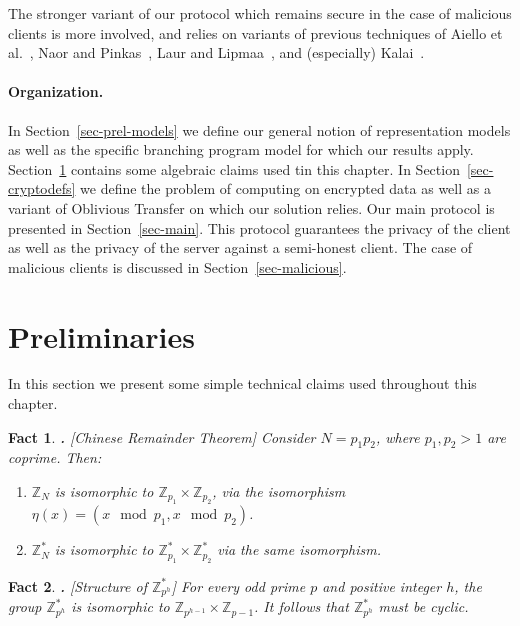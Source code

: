 \documentclass{article}
\newcommand{\Z}{{\mathbb{Z}}}
\newtheorem{FACT}{Fact}[section]
\newenvironment{fact}{\begin{FACT} \hspace{-.85em} {\bf .} \rm}%
	{\end{FACT}}
\newcommand{\U}[1]{\mathbb{Z}_{#1}^*}
\begin{document}
The stronger variant of our protocol which remains secure in the
case of malicious clients is more involved, and relies on variants
of previous techniques of Aiello et al.~\cite{AIR01}, Naor and
Pinkas~\cite{NP01}, Laur and Lipmaa~\cite{L05}, and (especially)
Kalai~\cite{T05}.


\paragraph{Organization.} In Section~\ref{sec-prel-models} we define our
general notion of representation models as well as the specific
branching program model for which our results apply. Section~\ref{sec-bp-prelims} contains
some algebraic claims used tin this chapter.
In Section~\ref{sec-cryptodefs} we define the problem of computing on
encrypted data as well as a variant of Oblivious Transfer on which
our solution relies. Our main protocol is presented in
Section~\ref{sec-main}. This protocol guarantees the privacy of the
client as well as the privacy of the server against a semi-honest
client. The case of malicious clients is discussed in
Section~\ref{sec-malicious}.

\section{Preliminaries}\label{sec-bp-prelims}
In this section we present some simple technical claims used throughout this chapter.

\begin{fact}[Chinese Remainder Theorem]
  \label{fact-crt} Consider $N=p_1p_2$, where $p_1,p_2>1$ are
  coprime. Then:
  \begin{enumerate}
    \item $\Z_N$ is isomorphic to $\Z_{p_1}\times\Z_{p_2}$,
    via the isomorphism $\eta(x)=(x\mod p_1,x\mod p_2)$.
    \item $\U{N}$ is isomorphic to $\U{p_1}\times\U{p_2}$ via the same
    isomorphism.
  \end{enumerate}
\end{fact}

\begin{fact}[Structure of $\U{p^h}$]
  \label{fact-zp-cyc} For every odd prime $p$ and positive integer
  $h$, the group $\U{p^h}$ is isomorphic to
  $\Z_{p^{h-1}}\times\Z_{p-1}$. It follows that $\U{p^h}$ must be
  cyclic.
\end{fact}
\end{document}
